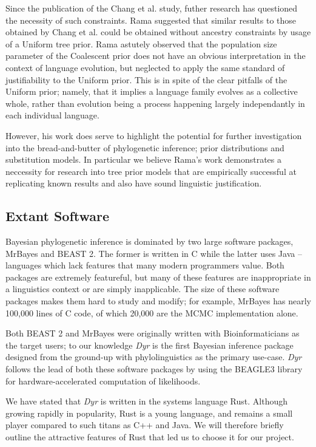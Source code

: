 \documentclass[10pt,journal,compsoc]{IEEEtran}
\begin{document}
Since the publication of the Chang et al. study, futher research has questioned the necessity of such constraints. Rama suggested that similar results to those obtained by Chang et al. could be obtained without ancestry constraints by usage of a Uniform tree prior.\cite{rama2018three} Rama astutely observed that the population size parameter of the Coalescent prior does not have an obvious interpretation in the context of language evolution, but neglected to apply the same standard of justifiability to the Uniform prior. This is in spite of the clear pitfalls of the Uniform prior; namely, that it implies a language family evolves as a collective whole, rather than evolution being a process happening largely independantly in each individual language.

However, his work does serve to highlight the potential for further investigation into the bread-and-butter of phylogenetic inference; prior distributions and substitution models. In particular we believe Rama's work demonstrates a neccessity for research into tree prior models that are empirically successful at replicating known results and also have sound linguistic justification. 

\subsection{Extant Software}

Bayesian phylogenetic inference is dominated by two large software packages, MrBayes\cite{ronquist2012mrbayes} and BEAST 2\cite{bouckaert2014beast}. The former is written in C while the latter uses Java -- languages which lack features that many modern programmers value. Both packages are extremely featureful, but many of these features are inappropriate in a linguistics context or are simply inapplicable. The size of these software packages makes them hard to study and modify; for example, MrBayes has nearly 100,000 lines of C code, of which 20,000 are the MCMC implementation alone.

Both BEAST 2 and MrBayes were originally written with Bioinformaticians as the target users; to our knowledge \textit{Dyr} is the first Bayesian inference package designed from the ground-up with phylolinguistics as the primary use-case. \textit{Dyr} follows the lead of both these software packages by using the BEAGLE3 library for hardware-accelerated computation of likelihoods.\cite{ayres2019beagle}

We have stated that \textit{Dyr} is written in the systems language Rust. Although growing rapidly in popularity, Rust is a young language, and remains a small player compared to such titans as C++ and Java. We will therefore briefly outline the attractive features of Rust that led us to choose it for our project.
\end{document}
